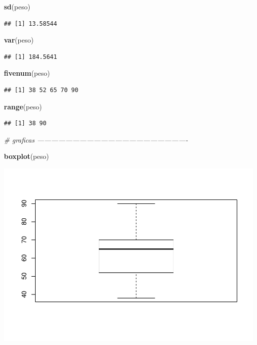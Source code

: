 \documentclass[
]{article}
\newenvironment{Shaded}{\begin{snugshade}}{\end{snugshade}}
\newcommand{\CommentTok}[1]{\textcolor[rgb]{0.56,0.35,0.01}{\textit{#1}}}
\newcommand{\KeywordTok}[1]{\textcolor[rgb]{0.13,0.29,0.53}{\textbf{#1}}}
\newcommand{\NormalTok}[1]{#1}
\begin{document}
\begin{Shaded}
\begin{Highlighting}[]
\KeywordTok{sd}\NormalTok{(peso)}
\end{Highlighting}
\end{Shaded}

\begin{verbatim}
## [1] 13.58544
\end{verbatim}

\begin{Shaded}
\begin{Highlighting}[]
\KeywordTok{var}\NormalTok{(peso)}
\end{Highlighting}
\end{Shaded}

\begin{verbatim}
## [1] 184.5641
\end{verbatim}

\begin{Shaded}
\begin{Highlighting}[]
\KeywordTok{fivenum}\NormalTok{(peso)}
\end{Highlighting}
\end{Shaded}

\begin{verbatim}
## [1] 38 52 65 70 90
\end{verbatim}

\begin{Shaded}
\begin{Highlighting}[]
\KeywordTok{range}\NormalTok{(peso)}
\end{Highlighting}
\end{Shaded}

\begin{verbatim}
## [1] 38 90
\end{verbatim}

\begin{Shaded}
\begin{Highlighting}[]
\CommentTok{# graficas ----------------------------------------------------------------}

\KeywordTok{boxplot}\NormalTok{(peso)}
\end{Highlighting}
\end{Shaded}

\includegraphics{scrip_1_files/figure-latex/unnamed-chunk-1-1.pdf}
\end{document}
